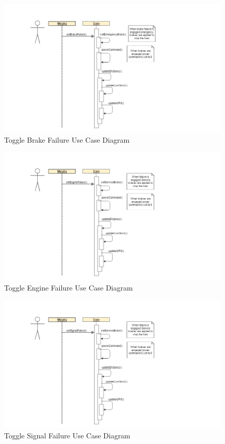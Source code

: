 \documentclass[]{article}
\begin{document}
\begin{figure}[H]
	\centering
	\includegraphics[scale=.5]{train_model_sqd_toggle_brake_failure.png}
	\caption{Toggle Brake Failure Use Case Diagram}
\end{figure}

\begin{figure}[H]
	\centering
	\includegraphics[scale=.5]{train_model_sqd_toggle_engine_failure.png}
	\caption{Toggle Engine Failure Use Case Diagram}
\end{figure}

\begin{figure}[H]
	\centering
	\includegraphics[scale=.5]{train_model_sqd_toggle_signal_failure.png}
	\caption{Toggle Signal Failure Use Case Diagram}
\end{figure}
\end{document}
